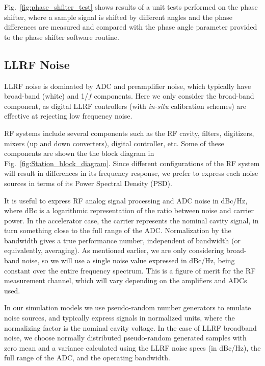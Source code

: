 \documentclass[a4paper,12pt]{article}
\begin{document}
Fig.~\ref{fig:phase_shfiter_test} shows results of a unit tests performed on the phase shifter, where a sample signal is shifted by different angles and the phase differences are measured and compared with the phase angle parameter provided to the phase shifter software routine.

\subsection{LLRF Noise}

LLRF noise is dominated by ADC and preamplifier noise, which typically have broad-band (white) and 1/$f$ components. Here we only consider the broad-band component, as digital LLRF controllers (with {\it in-situ} calibration schemes) are effective at rejecting low frequency noise.

RF systems include several components such as the RF cavity, filters, digitizers, mixers (up and down converters), digital controller, etc. Some of these components are shown the the block diagram in Fig.~\ref{fig:Station_block_diagram}. Since different configurations of the RF system will result in differences in its frequency response, we prefer to express each noise sources in terms of its Power Spectral Density (PSD).

It is useful to express RF analog signal processing and ADC noise in dBc/Hz, where dBc is a logarithmic representation of the ratio between noise and carrier power. In the accelerator case, the carrier represents the nominal cavity signal, in turn something close to the full range of the \hbox{ADC}.  Normalization by the bandwidth gives a true performance number, independent of bandwidth (or equivalently, averaging). As mentioned earlier, we are only considering broad-band noise, so we will use a single noise value expressed in dBc/Hz, being constant over the entire frequency spectrum. This is a figure of merit for the RF measurement channel, which will vary depending on the amplifiers and ADCs used.

In our simulation models we use pseudo-random number generators to emulate noise sources, and typically express signals in normalized units, where the normalizing factor is the nominal cavity voltage. In the case of LLRF broadband noise, we choose normally distributed pseudo-random generated samples with zero mean and a variance calculated using the LLRF noise specs (in dBc/Hz), the full range of the ADC, and the operating bandwidth.
\end{document}
